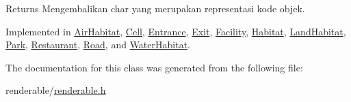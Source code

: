 \begin{DoxyReturn}{Returns}
Mengembalikan char yang merupakan representasi kode objek. 
\end{DoxyReturn}


Implemented in \hyperlink{classAirHabitat_a6dd1a0d8235d9687874bb229099d40ff}{Air\+Habitat}, \hyperlink{classCell_a1d72940d69d96132a445212155e3e789}{Cell}, \hyperlink{classEntrance_a7226e0cd3d04f8370ede2573bc2852f3}{Entrance}, \hyperlink{classExit_a9239e8b13c101d1aee8fde738e8a5fdc}{Exit}, \hyperlink{classFacility_a177b3f9cd142fe4521c1d15b00d3675c}{Facility}, \hyperlink{classHabitat_ad1bf10205d38e8e308eb9acc3aa2872c}{Habitat}, \hyperlink{classLandHabitat_ad2147498f493b01429ae315f0145d3a9}{Land\+Habitat}, \hyperlink{classPark_a98b2a346d5ec6703b2e988588950947e}{Park}, \hyperlink{classRestaurant_a8a44dac5fd1d460aed3a5631e9eb732a}{Restaurant}, \hyperlink{classRoad_a72268486a71718b5b7957b63ecd565bc}{Road}, and \hyperlink{classWaterHabitat_a014ef4d2a9e5f37ac70a61d3f060b983}{Water\+Habitat}.



The documentation for this class was generated from the following file\+:\begin{DoxyCompactItemize}
\item 
renderable/\hyperlink{renderable_8h}{renderable.\+h}\end{DoxyCompactItemize}
